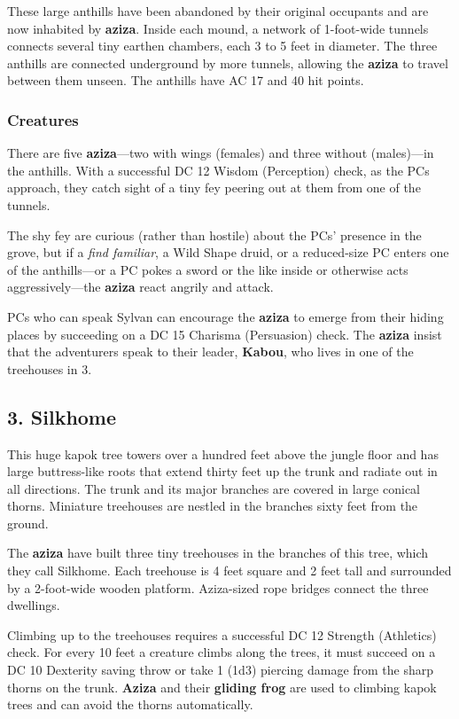 \documentclass[10pt,a4paper,twoside,bg=print,twocolumn,openany,nodeprecatedcode]{dndbook}
\begin{document}
These large anthills have been abandoned by their original occupants and are now inhabited by \textbf{aziza}. Inside each mound, a network of 1-foot-wide tunnels connects several tiny earthen chambers, each 3 to 5 feet in diameter. The three anthills are connected underground by more tunnels, allowing the \textbf{aziza} to travel between them unseen. The anthills have AC 17 and 40 hit points.

\subsubsection{Creatures}
There are five \textbf{aziza}—two with wings (females) and three without (males)—in the anthills. With a successful DC 12 Wisdom (Perception) check, as the PCs approach, they catch sight of a tiny fey peering out at them from one of the tunnels.

The shy fey are curious (rather than hostile) about the PCs' presence in the grove, but if a \textit{find familiar}, a Wild Shape druid, or a reduced-size PC enters one of the anthills—or a PC pokes a sword or the like inside or otherwise acts aggressively—the \textbf{aziza} react angrily and attack.

PCs who can speak Sylvan can encourage the \textbf{aziza} to emerge from their hiding places by succeeding on a DC 15 Charisma (Persuasion) check. The \textbf{aziza} insist that the adventurers speak to their leader, \textbf{Kabou}, who lives in one of the treehouses in 3.

\subsection{3. Silkhome}
\begin{DndReadAloud}{}
This huge kapok tree towers over a hundred feet above the jungle floor and has large buttress-like roots that extend thirty feet up the trunk and radiate out in all directions. The trunk and its major branches are covered in large conical thorns. Miniature treehouses are nestled in the branches sixty feet from the ground.

\end{DndReadAloud}

The \textbf{aziza} have built three tiny treehouses in the branches of this tree, which they call Silkhome. Each treehouse is 4 feet square and 2 feet tall and surrounded by a 2-foot-wide wooden platform. Aziza-sized rope bridges connect the three dwellings.

Climbing up to the treehouses requires a successful DC 12 Strength (Athletics) check. For every 10 feet a creature climbs along the trees, it must succeed on a DC 10 Dexterity saving throw or take 1 (1d3) piercing damage from the sharp thorns on the trunk. \textbf{Aziza} and their \textbf{gliding frog} are used to climbing kapok trees and can avoid the thorns automatically.
\end{document}
